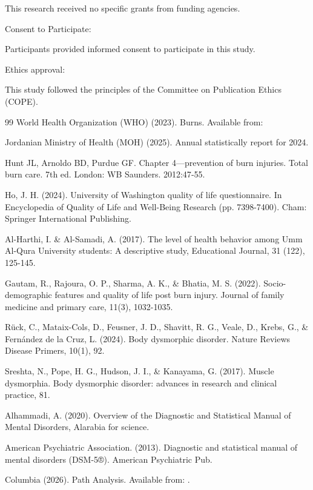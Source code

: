 \documentclass[10pt]{NSP1}
\begin{document}
This research received no specific grants from funding agencies.

Consent to Participate:

Participants provided informed consent to participate in this study.

Ethics approval:

This study followed the principles of the Committee on Publication Ethics (COPE).

\begin{thebibliography}{99}
World Health Organization (WHO) (2023). Burns. Available from:

Jordanian Ministry of Health (MOH) (2025). Annual statistically report for 2024.

Hunt JL, Arnoldo BD, Purdue GF. Chapter 4—prevention of burn injuries. Total burn care. 7th ed. London: WB Saunders. 2012:47‑55.

Ho, J. H. (2024). University of Washington quality of life questionnaire. In Encyclopedia of Quality of Life and Well-Being Research (pp. 7398-7400). Cham: Springer International Publishing.

Al-Harthi, I. \& Al-Samadi, A. (2017). The level of health behavior among Umm Al-Qura University students: A descriptive study, Educational Journal, 31 (122), 125-145.

Gautam, R., Rajoura, O. P., Sharma, A. K., \& Bhatia, M. S. (2022). Socio-demographic features and quality of life post burn injury. Journal of family medicine and primary care, 11(3), 1032-1035.

Rück, C., Mataix-Cols, D., Feusner, J. D., Shavitt, R. G., Veale, D., Krebs, G., \& Fernández de la Cruz, L. (2024). Body dysmorphic disorder. Nature Reviews Disease Primers, 10(1), 92.

Sreshta, N., Pope, H. G., Hudson, J. I., \& Kanayama, G. (2017). Muscle dysmorphia. Body dysmorphic disorder: advances in research and clinical practice, 81.

Alhammadi, A. (2020). Overview of the Diagnostic and Statistical Manual of Mental Disorders, Alarabia for science.

American Psychiatric Association. (2013). Diagnostic and statistical manual of mental disorders (DSM-5®). American Psychiatric Pub.

Columbia (2026). Path Analysis. Available from: .


\end{thebibliography}
\end{document}
